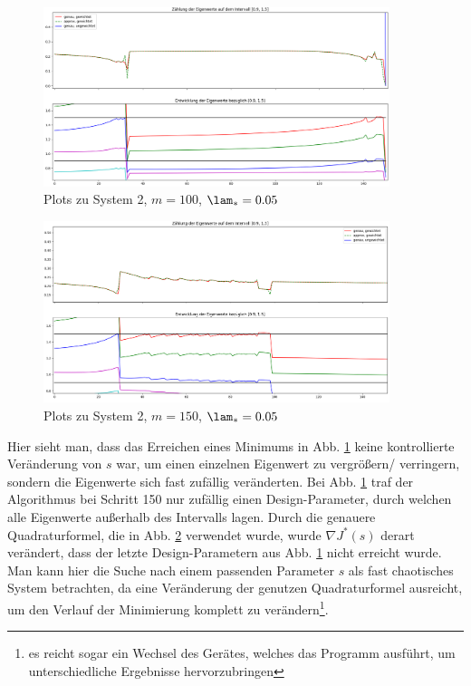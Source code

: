\documentclass[a4paper,12pt]{report}
\newcommand{\1}{\mathds{1}}
\theoremstyle{plain} %
\theoremstyle{definition} %
\theoremstyle{remark}
\begin{document}
            \begin{figure}[ht]
                  \centering
                  \includegraphics[width=0.9\textwidth, keepaspectratio]{./Original/Plot_2_100_0.05.png}
                  \caption{Plots zu System 2, $m=100$, $\lam_*=0.05$}
                  \label{fig: Plot_2_100_0.05}
            \end{figure}

            \begin{figure}[ht]
                  \centering
                  \includegraphics[width=0.9\textwidth, keepaspectratio]{./Original/Plot_2_150_0.05.png}
                  \caption{Plots zu System 2, $m=150$, $\lam_*=0.05$}
                  \label{fig: Plot_2_150_0.05}
            \end{figure}

            Hier sieht man, dass das Erreichen eines Minimums in Abb. \ref{fig: Plot_2_100_0.05} keine kontrollierte Veränderung von $s$ war, um einen einzelnen Eigenwert zu vergrößern/ verringern, sondern die Eigenwerte sich fast zufällig veränderten.
            Bei Abb. \ref{fig: Plot_2_100_0.05} traf der Algorithmus bei Schritt 150 nur zufällig einen Design-Parameter, durch welchen alle Eigenwerte außerhalb des Intervalls lagen.
            Durch die genauere Quadraturformel, die in Abb. \ref{fig: Plot_2_150_0.05} verwendet wurde, wurde $\nabla J^*(s)$ derart verändert, dass der letzte Design-Parametern aus Abb. \ref{fig: Plot_2_100_0.05} nicht erreicht wurde.
            Man kann hier die Suche nach einem passenden Parameter $s$ als fast chaotisches System betrachten, da eine Veränderung der genutzen Quadraturformel ausreicht, um den Verlauf der Minimierung komplett zu verändern\footnote{es reicht sogar ein Wechsel des Gerätes, welches das Programm ausführt, um unterschiedliche Ergebnisse hervorzubringen}.
\end{document}
